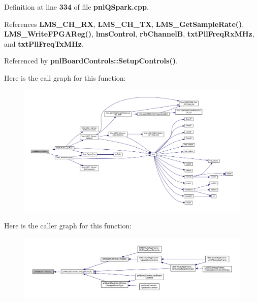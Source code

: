 Definition at line {\bf 334} of file {\bf pnl\+Q\+Spark.\+cpp}.



References {\bf L\+M\+S\+\_\+\+C\+H\+\_\+\+RX}, {\bf L\+M\+S\+\_\+\+C\+H\+\_\+\+TX}, {\bf L\+M\+S\+\_\+\+Get\+Sample\+Rate()}, {\bf L\+M\+S\+\_\+\+Write\+F\+P\+G\+A\+Reg()}, {\bf lms\+Control}, {\bf rb\+ChannelB}, {\bf txt\+Pll\+Freq\+Rx\+M\+Hz}, and {\bf txt\+Pll\+Freq\+Tx\+M\+Hz}.



Referenced by {\bf pnl\+Board\+Controls\+::\+Setup\+Controls()}.



Here is the call graph for this function\+:
\nopagebreak
\begin{figure}[H]
\begin{center}
\leavevmode
\includegraphics[width=350pt]{d5/d92/classpnlQSpark_a240f40e2967cfd78e5609101c28b3463_cgraph}
\end{center}
\end{figure}




Here is the caller graph for this function\+:
\nopagebreak
\begin{figure}[H]
\begin{center}
\leavevmode
\includegraphics[width=350pt]{d5/d92/classpnlQSpark_a240f40e2967cfd78e5609101c28b3463_icgraph}
\end{center}
\end{figure}



